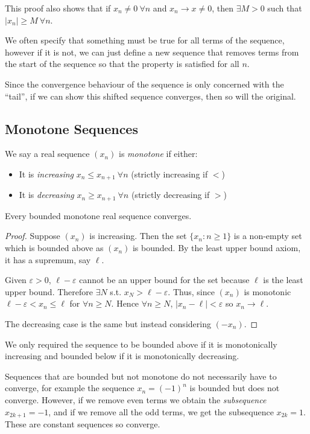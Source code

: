 \documentclass[../main.tex]{subfiles}
\begin{document}
\begin{remark}
  This proof also shows that if $x_n \neq 0\ \forall n$ and $x_n \to x \neq 0$, then $\exists M > 0$ such that $|x_n| \geq M\ \forall n$.
\end{remark}
\begin{remark}[Advice]
  We often specify that something must be true for all terms of the sequence, however if it is not, we can just define a new sequence that removes terms from the start of the sequence so that the property is satisfied for all $n$.

  Since the convergence behaviour of the sequence is only concerned with the ``tail'', if we can show this shifted sequence converges, then so will the original.
\end{remark}
\subsection{Monotone Sequences}
\begin{definition}
  We say a real sequence $(x_n)$ is \textit{monotone} if either:
  \begin{itemize}
    \item It is \textit{increasing} $x_n \leq x_{n + 1}\ \forall n$ (strictly increasing if $<$)
    \item It is \textit{decreasing} $x_n \geq x_{n + 1}\ \forall n$ (strictly decreasing if $>$)
  \end{itemize}
\end{definition}
\begin{proposition}
  Every bounded monotone real sequence converges.
  \label{monotoneConvergence}
\end{proposition}
\begin{proof}
  Suppose $(x_n)$ is increasing.
  Then the set $\{x_n: n \geq 1\}$ is a non-empty set which is bounded above as $(x_n)$ is bounded.
  By the least upper bound axiom, it has a supremum, say $\ell$.

  Given $\varepsilon > 0$, $\ell - \varepsilon$ cannot be an upper bound for the set because $\ell$ is the least upper bound.
  Therefore $\exists N$ s.t. $x_N > \ell - \varepsilon$.
  Thus, since $(x_n)$ is monotonic $\ell - \varepsilon < x_n \leq \ell$ for $\forall n \geq N$.
  Hence $\forall n \geq N$, $|x_n -\ell| < \varepsilon$ so $x_n \to \ell$.

  The decreasing case is the same but instead considering $(-x_n)$.
\end{proof}
\begin{remark}
  We only required the sequence to be bounded above if it is monotonically increasing and bounded below if it is monotonically decreasing.
\end{remark}
Sequences that are bounded but not monotone do not necessarily have to converge, for example the sequence $x_n = (-1)^{n}$ is bounded but does not converge.
However, if we remove even terms we obtain the \textit{subsequence} $x_{2k + 1} = -1$, and if we remove all the odd terms, we get the subsequence $x_{2k} = 1$.
These are constant sequences so converge.
\end{document}
